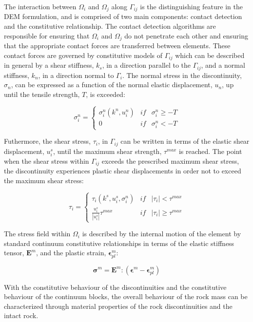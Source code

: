 
The interaction between $\Omega_i$ and $\Omega_j$ along $\Gamma_{ij}$ is the distinguishing feature in the DEM formulation, and is comprised of two main components: contact detection and the constitutive relationship. The contact detection algorithms are responsible for ensuring that $\Omega_i$ and $\Omega_j$ do not penetrate each other and ensuring that the appropriate contact forces are transferred between elements. These contact forces are governed by constitutive models of $\Gamma_{ij}$ which can be described in general by a shear stiffness, $k_s$, in a direction parallel to the $\Gamma_{ij}$, and a normal stiffness, $k_n$, in a direction normal to $\Gamma_i$. The normal stress in the discontinuity, $\sigma_n$, can be expressed as a function of the normal elastic displacement, $u_n$, up until the tensile strength, $T$, is exceeded: 

\begin{equation}
\sigma^n_i=\left\{\begin{matrix}
\sigma^n_i\left(k^n, u_i^n\right) &if& \sigma^n_i \geq -T\\ 
 0 & if &\sigma^n_i < -T
\end{matrix}\right.
\label{eqn:demnormal}
\end{equation}

Futhermore, the shear stress, $\tau_i$, in $\Gamma_{ij}$ can be written in terms of the elastic shear displacement, $u_i^s$, until the maximum shear strength, $\tau^{max}$ is reached. The point when the shear stress within $\Gamma_{ij}$ exceeds the prescribed maximum shear stress, the discontinuity experiences plastic shear displacements in order not to exceed the maximum shear stress:

\begin{equation}
\tau_i=\left\{\begin{matrix}
\tau_i\left(k^s,u_i^s, \sigma_i^n\right) &if&\left |\tau_i \right | < \tau^{max}\\ 
\frac{u_i^s}{\left|u_i^s\right|}\tau^{max} & if &\left |\tau_i \right | \geq \tau^{max}
\end{matrix}\right.
\label{eqn:demshear}
\end{equation}

The stress field within $\Omega_i$ is described by the internal motion of the element by standard continuum constitutive relationships in terms of the elastic stiffness tensor, $\mathbf{E}^m$, and the plastic strain, $\boldsymbol{\epsilon}^m_{pl}$:  

\begin{equation}
\boldsymbol{\sigma}^m =\mathbf{E}^m:\left(\boldsymbol{\epsilon}^m - \boldsymbol{\epsilon}^m_{pl}\right)
\label{eqn:demcont}
\end{equation}

With the constitutive behaviour of the discontinuities and the constitutive behaviour of the continuum blocks, the overall behaviour of the rock mass can be characterized through material properties of the rock discontinuities and the intact rock.